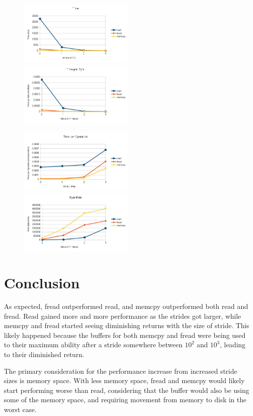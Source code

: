 \documentclass[]{scrartcl}
\begin{document}
\begin{figure}
\includegraphics[width=0.5\textwidth]{Time.jpg}
\includegraphics[width=0.5\textwidth]{TimePerByte.jpg}

\includegraphics[width=0.5\textwidth]{TimePerOp.jpg}
\includegraphics[width=0.5\textwidth]{BytePerTime.jpg}
\end{figure}

\section*{Conclusion}
As expected, fread outperformed read, and memcpy outperformed both read and fread. Read gained more and more performance as the strides got larger, while memcpy and fread started seeing diminishing returns with the size of stride. This likely happened because the buffers for both memcpy and fread were being used to their maximum ability after a stride somewhere between $10^2$ and $10^3$, leading to their diminished return.

The primary consideration for the performance increase from increased stride sizes is memory space. With less memory space, fread and memcpy would likely start performing worse than read, considering that the buffer would also be using some of the memory space, and requiring movement from memory to disk in the worst case.
\end{document}
